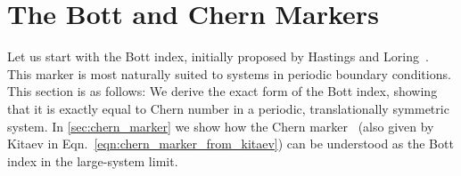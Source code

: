 \section{The Bott and Chern Markers}
\label{sec:bott_chern}

Let us start with the Bott index, initially proposed by Hastings and Loring~\cite{hastings_almost_2010,hastings_topological_2011}. This marker is most naturally suited to systems in periodic boundary conditions. This section is as follows: We derive the exact form of the Bott index, showing that it is exactly equal to Chern number in a periodic, translationally symmetric system. In \textsection\ref{sec:chern_marker} we show how the Chern marker~\cite{bianco_mapping_2011} (also given by Kitaev in Eqn.~\ref{eqn:chern_marker_from_kitaev}) can be understood as the Bott index in the large-system limit.

